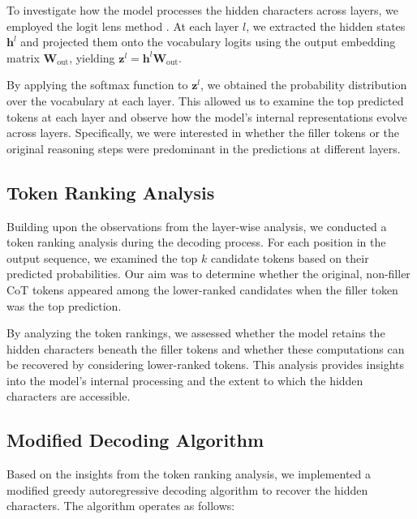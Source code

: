 \documentclass{article}
\begin{document}
To investigate how the model processes the hidden characters across layers, we employed the logit lens method \cite{nostalgebraist2020}. At each layer $l$, we extracted the hidden states $\mathbf{h}^l$ and projected them onto the vocabulary logits using the output embedding matrix $\mathbf{W}_{\text{out}}$, yielding $\mathbf{z}^l = \mathbf{h}^l \mathbf{W}_{\text{out}}$.

By applying the softmax function to $\mathbf{z}^l$, we obtained the probability distribution over the vocabulary at each layer. This allowed us to examine the top predicted tokens at each layer and observe how the model's internal representations evolve across layers. Specifically, we were interested in whether the filler tokens or the original reasoning steps were predominant in the predictions at different layers.

\subsection{Token Ranking Analysis}

Building upon the observations from the layer-wise analysis, we conducted a token ranking analysis during the decoding process. For each position in the output sequence, we examined the top $k$ candidate tokens based on their predicted probabilities. Our aim was to determine whether the original, non-filler CoT tokens appeared among the lower-ranked candidates when the filler token was the top prediction.

By analyzing the token rankings, we assessed whether the model retains the hidden characters beneath the filler tokens and whether these computations can be recovered by considering lower-ranked tokens. This analysis provides insights into the model's internal processing and the extent to which the hidden characters are accessible.

\subsection{Modified Decoding Algorithm}
\label{ssec:Filler tokens}

Based on the insights from the token ranking analysis, we implemented a modified greedy autoregressive decoding algorithm to recover the hidden characters. The algorithm operates as follows:
\end{document}
